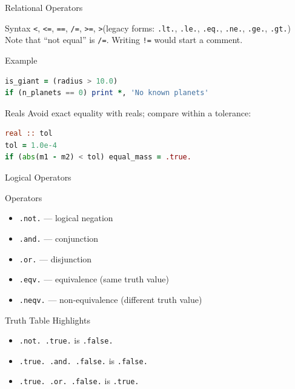\begin{frame}[fragile]{Relational Operators}
  \begin{block}{Syntax}
  \texttt{<}, \texttt{<=}, \texttt{==}, \texttt{/=}, \texttt{>=}, \texttt{>}\quad (legacy forms: \texttt{.lt.}, \texttt{.le.}, \texttt{.eq.}, \texttt{.ne.}, \texttt{.ge.}, \texttt{.gt.})\\
  Note that ``not equal'' is \texttt{/=}. Writing \texttt{!=} would start a comment.
  \end{block}
  \begin{block}{Example}
\begin{lstlisting}[language=Fortran]
is_giant = (radius > 10.0)
if (n_planets == 0) print *, 'No known planets'
\end{lstlisting}
  \end{block}
  \begin{block}{Reals}
  Avoid exact equality with reals; compare within a tolerance:
\begin{lstlisting}[language=Fortran]
real :: tol
tol = 1.0e-4
if (abs(m1 - m2) < tol) equal_mass = .true.
\end{lstlisting}
  \end{block}
\end{frame}

\begin{frame}{Logical Operators}
  \begin{block}{Operators}
  \begin{itemize}
    \item \texttt{.not.} — logical negation
    \item \texttt{.and.} — conjunction
    \item \texttt{.or.} — disjunction
    \item \texttt{.eqv.} — equivalence (same truth value)
    \item \texttt{.neqv.} — non-equivalence (different truth value)
  \end{itemize}
  \end{block}
  \begin{block}{Truth Table Highlights}
  \begin{itemize}
    \item \texttt{.not. .true.} is \texttt{.false.}
    \item \texttt{.true. .and. .false.} is \texttt{.false.}
    \item \texttt{.true. .or. .false.} is \texttt{.true.}
  \end{itemize}
  \end{block}
\end{frame}

